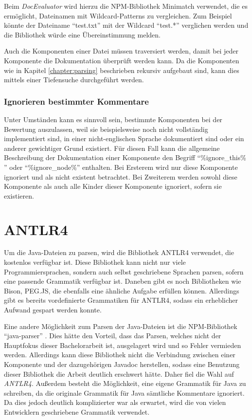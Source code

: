 Beim \textit{DocEvaluator} wird hierzu die NPM-Bibliothek Minimatch \cite{Minimatch} verwendet, die es ermöglicht, Dateinamen mit Wildcard-Patterns zu vergleichen. Zum Beispiel könnte der Dateiname \enquote{test.txt} mit der Wildcard \enquote{test.*} verglichen werden und die Bibliothek würde eine Übereinstimmung melden.

Auch die Komponenten einer Datei müssen traversiert werden, damit bei jeder Komponente die Dokumentation überprüft werden kann. Da die Komponenten wie in Kapitel \ref{chapter:parsing} beschrieben rekursiv aufgebaut sind, kann dies mittels einer Tiefensuche durchgeführt werden.

\subsubsection{Ignorieren bestimmter Kommentare}

Unter Umständen kann es sinnvoll sein, bestimmte Komponenten bei der Bewertung auszulassen, weil sie beispielsweise noch nicht vollständig implementiert sind, in einer nicht-englischen Sprache dokumentiert sind oder ein anderer gewichtiger Grund existiert. Für diesen Fall kann die allgemeine Beschreibung der Dokumentation einer Komponente  den Begriff \enquote{\%ignore\_this\% } oder \enquote{\%ignore\_node\%} enthalten. Bei Ersterem wird nur diese Komponente ignoriert und als nicht existent betrachtet. Bei Zweiterem werden sowohl diese Komponente als auch alle Kinder dieser Komponente ignoriert, sofern sie existieren.


\section{ANTLR4}
Um die Java-Dateien zu parsen, wird die Bibliothek ANTLR4 \cite{ANTLR} verwendet, die kostenlos verfügbar ist. Diese Bibliothek kann nicht nur viele Programmiersprachen, sondern auch selbst geschriebene Sprachen parsen, sofern eine passende Grammatik verfügbar ist. Daneben gibt es noch Bibliotheken wie Bison, PEG.JS, die ebenfalls eine ähnliche Aufgabe erfüllen können. Allerdings gibt es bereits vordefinierte Grammatiken für ANTLR4, sodass ein erheblicher Aufwand gespart werden konnte.  

Eine andere Möglichkeit zum Parsen der Java-Dateien ist die NPM-Bibliothek \enquote{java-parser} \cite{Java-parser}. Dies hätte den Vorteil, dass das Parsen, welches nicht der Hauptfokus dieser Bachelorarbeit ist, ausgelagert wird und so Fehler vermieden werden. Allerdings kann diese Bibliothek nicht die Verbindung zwischen einer Komponente und der dazugehörigen Javadoc herstellen, sodass eine Benutzung dieser Bibliothek die Arbeit deutlich erschwert hätte. Daher fiel die Wahl auf \textit{ANTLR4}. Außerdem besteht die Möglichkeit, eine eigene Grammatik für Java zu schreiben, da die originale Grammatik für Java sämtliche Kommentare ignoriert. Da dies jedoch deutlich komplizierter war als erwartet, wird die von vielen Entwicklern geschriebene Grammatik verwendet.


